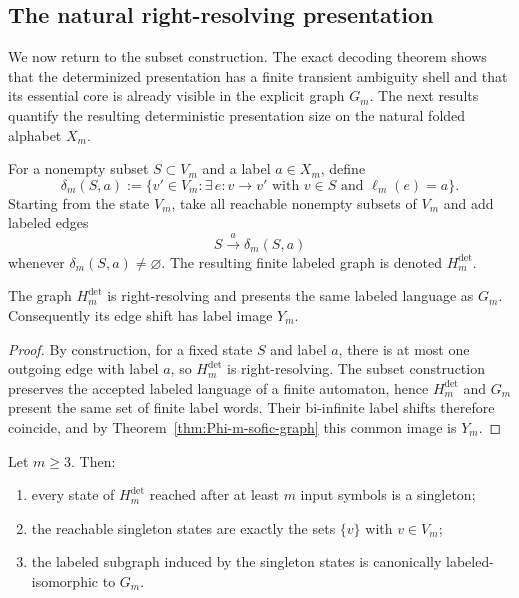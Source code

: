 \subsection{The natural right-resolving presentation}

We now return to the subset construction.  The exact decoding theorem shows
that the determinized presentation has a finite transient ambiguity shell and
that its essential core is already visible in the explicit graph $G_m$.  The
next results quantify the resulting deterministic presentation size on the
natural folded alphabet $X_m$.

\begin{definition}
\label{def:Phi-m-right-resolving}
For a nonempty subset $S\subset V_m$ and a label $a\in X_m$, define
\[
\delta_m(S,a):=
\{v'\in V_m:\exists\, e:v\to v' \text{ with } v\in S \text{ and } \ell_m(e)=a\}.
\]
Starting from the state $V_m$, take all reachable nonempty subsets of $V_m$ and
add labeled edges
\[
S\xrightarrow{a}\delta_m(S,a)
\]
whenever $\delta_m(S,a)\neq \varnothing$.  The resulting finite labeled graph
is denoted $H_m^{\mathrm{det}}$.
\end{definition}

\begin{proposition}
\label{prop:Phi-m-right-resolving}
The graph $H_m^{\mathrm{det}}$ is right-resolving and presents the same labeled
language as $G_m$.  Consequently its edge shift has label image $Y_m$.
\end{proposition}

\begin{proof}
By construction, for a fixed state $S$ and label $a$, there is at most one
outgoing edge with label $a$, so $H_m^{\mathrm{det}}$ is right-resolving.  The
subset construction preserves the accepted labeled language of a finite
automaton, hence $H_m^{\mathrm{det}}$ and $G_m$ present the same set of finite
label words.  Their bi-infinite label shifts therefore coincide, and by
Theorem~\ref{thm:Phi-m-sofic-graph} this common image is $Y_m$.
\end{proof}

\begin{proposition}
\label{prop:deterministic-singleton-core}
Let $m\ge 3$.  Then:
\begin{enumerate}[label=\textup{(\roman*)}]
\item every state of $H_m^{\mathrm{det}}$ reached after at least $m$ input
symbols is a singleton;
\item the reachable singleton states are exactly the sets $\{v\}$ with
$v\in V_m$;
\item the labeled subgraph induced by the singleton states is canonically
labeled-isomorphic to $G_m$.
\end{enumerate}
\end{proposition}

